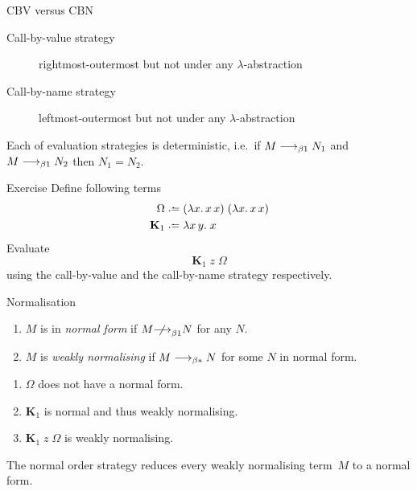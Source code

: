 \begin{frame}{CBV versus CBN}
\begin{description}
  \item[Call-by-value strategy]
    rightmost-outermost but not under any $\lambda$-abstraction
  \item[Call-by-name strategy]
    leftmost-outermost but not under any $\lambda$-abstraction
\end{description}

\begin{proposition}[Determinacy]
  Each of evaluation strategies is deterministic, i.e.\ 
  if $M \longrightarrow_{\beta1} N_1$ and $M \longrightarrow_{\beta1} N_2$ then $N_1 = N_2$.
\end{proposition}
\end{frame}

\begin{frame}{Exercise}
  Define following terms
\begin{align*}
  \Omega &\defeq (\lambda x.\, x\,x)\;(\lambda x.\,x\,x) \\
  \mathbf{K}_1 & \defeq \lambda x\,y.\;x
\end{align*}
Evaluate 
\[
  \mathbf{K}_1\;z\;\Omega
\]
using the call-by-value and the call-by-name strategy respectively.
\end{frame}

\begin{frame}{Normalisation}
\begin{definition}
  \begin{enumerate}
    \item $M$ is in \emph{normal form} if $M \notonereduce N$ for any $N$. 
    \item $M$ is \emph{weakly normalising} if $M \longrightarrow_{\beta*} N$ for some $N$ in
      normal form.
  \end{enumerate}
\end{definition}
%
  \begin{enumerate}
    \item $\Omega$ does not have a normal form.
    \item $\mathbf{K}_1$ is normal and thus weakly normalising.
    \item $\mathbf{K}_1\;z\; \Omega$ is weakly normalising.
  \end{enumerate}

\begin{theorem}
  The normal order strategy reduces every weakly
  normalising term~$M$ to a normal form.
\end{theorem}

\end{frame}

